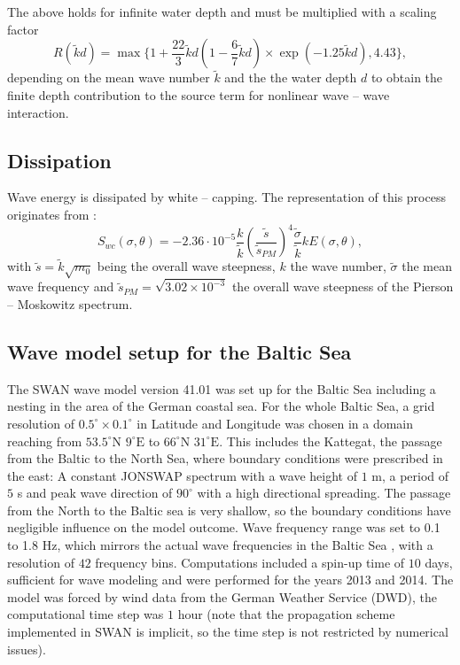 The above holds for infinite water depth and must be multiplied with a scaling 
factor 
\begin{equation}
 R ( \tilde{k}d ) = \max \{ 1+ \frac{22}{3}\tilde{k}d \left( 1-\frac{6}{7} \tilde{k}d \right) \times \exp(-1.25 \tilde{k}d) , 4.43 \} ,
\end{equation}
depending on the mean wave number $\tilde{k}$ and the the water depth $d$ to obtain the finite depth contribution to the source term for nonlinear wave -- wave interaction.

\subsection{Dissipation}

Wave energy is dissipated by white -- capping. The representation of this process originates from \citep[][]{hasselmann1974}:
\begin{equation}
 S_{wc} (\sigma, \theta ) = - 2.36 \cdot 10^{-5} \frac{k}{\tilde{k}} \left( \frac{\tilde{s}}{\tilde{s}_{PM}} \right)^4 \frac{\tilde{\sigma}}{\tilde{k}} k E(\sigma, \theta),
\end{equation}
with $\tilde{s} = \tilde{k} \sqrt{m_0}$ being the overall wave steepness, $k$ 
the wave number, $\tilde{\sigma}$ the mean wave frequency and $\tilde{s}_{PM} = 
\sqrt{3.02 \times 10^{-3}}$ the overall wave steepness of the Pierson -- 
Moskowitz spectrum.


\subsection{Wave model setup for the Baltic Sea}\label{balticswan}

The SWAN wave model version 41.01 was set up for the Baltic Sea including a 
nesting in the area of the German coastal sea. For the whole Baltic Sea, a grid 
resolution of $0.5^\circ \times 0.1^\circ $ in Latitude and Longitude was chosen 
in a domain reaching from $53.5^\circ \text{N } 9^\circ \text{E}$ to $66^\circ 
\text{N } 31^\circ \text{E}$. This includes the Kattegat, the passage from the 
Baltic to the North Sea, where boundary conditions were prescribed in the east: 
A constant JONSWAP spectrum with a wave height of $1$ m, a period of $5$ s and 
peak wave direction of $90^\circ$ with a high directional spreading. The passage 
from the North to the Baltic sea is very shallow, so the boundary conditions 
have negligible influence on the model outcome. Wave frequency range was set to 
0.1 to 1.8 Hz, which mirrors the actual wave frequencies in the Baltic 
Sea \citep[][]{balticsea}, with a resolution of $42$ frequency bins. 
Computations included a spin-up time of $10$ days, sufficient for wave modeling 
and were performed for the years 2013 and 2014. The model was forced by wind 
data from the German Weather Service (DWD), the computational time step was $1$ 
hour (note that the propagation scheme implemented in SWAN is implicit, so the 
time step is not restricted by numerical issues). 

